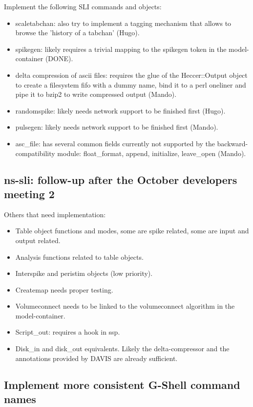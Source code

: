 \documentclass[12pt]{article}
\begin{document}
Implement the following SLI commands and objects:

\begin{itemize}
\item scaletabchan: also try to implement a tagging mechanism that
  allows to browse the 'history of a tabchan' (Hugo).
\item spikegen: likely requires a trivial mapping to the spikegen
  token in the model-container (DONE).
\item delta compression of ascii files: requires the glue of the
  Heccer::Output object to create a filesystem fifo with a dummy name,
  bind it to a perl oneliner and pipe it to bzip2 to write compressed
  output (Mando).
\item randomspike: likely needs network support to be finished first
  (Hugo).
\item pulsegen: likely needs network support to be finished first
  (Mando).
\item asc\_file: has several common fields currently not supported by
  the backward-compatibility module: float\_format, append, initialize,
  leave\_open (Mando).
\end{itemize}

\subsection{ns-sli: follow-up after the October developers meeting 2}

Others that need implementation:

\begin{itemize}
\item Table object functions and modes, some are spike related, some
  are input and output related.
\item Analysis functions related to table objects.
\item Interspike and peristim objects (low priority).
\item Createmap needs proper testing.
\item Volumeconnect needs to be linked to the volumeconnect algorithm
  in the model-container.
\item Script\_out: requires a hook in ssp.
\item Disk\_in and disk\_out equivalents.  Likely the delta-compressor
  and the annotations provided by DAVIS are already sufficient.
\end{itemize}

\subsection{Implement more consistent G-Shell command names}
\end{document}
